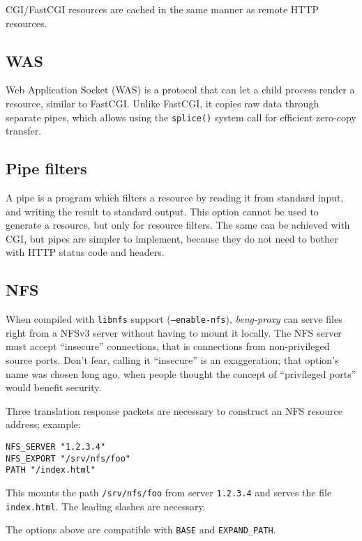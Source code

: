 \documentclass[a4paper,12pt]{article}
\begin{document}
CGI/FastCGI resources are cached in the same manner as remote HTTP
resources.

\subsection{WAS}
\label{was}

Web Application Socket (WAS) is a protocol that can let a child process
render a resource, similar to FastCGI.  Unlike FastCGI, it copies raw
data through separate pipes, which allows using the \texttt{splice()}
system call for efficient zero-copy transfer.

\subsection{Pipe filters}
\label{pipe}

A pipe is a program which filters a resource by reading it from
standard input, and writing the result to standard output.  This
option cannot be used to generate a resource, but only for resource
filters.  The same can be achieved with CGI, but pipes are simpler to
implement, because they do not need to bother with HTTP status code
and headers.

\subsection{NFS}
\label{nfs}

When compiled with \texttt{libnfs} support (\texttt{--enable-nfs}),
\emph{beng-proxy} can serve files right from a NFSv3 server without
having to mount it locally.  The NFS server must accept ``insecure''
connections, that is connections from non-privileged source ports.
Don't fear, calling it ``insecure'' is an exaggeration; that option's
name was chosen long ago, when people thought the concept of
``privileged ports'' would benefit security.

Three translation response packets are necessary to construct an NFS
resource address; example:

\begin{verbatim}
NFS_SERVER "1.2.3.4"
NFS_EXPORT "/srv/nfs/foo"
PATH "/index.html"
\end{verbatim}

This mounts the path \texttt{/srv/nfs/foo} from server
\texttt{1.2.3.4} and serves the file \texttt{index.html}.  The
leading slashes are necessary.

The options above are compatible with \verb|BASE| and
\verb|EXPAND_PATH|.
\end{document}
